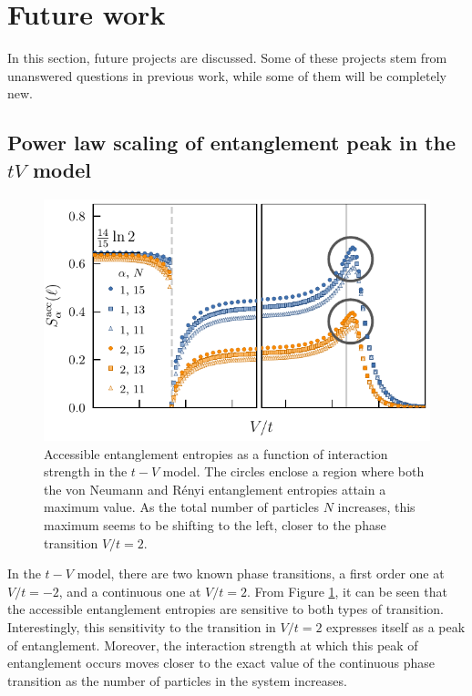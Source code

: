 \section{Future work}

	In this section, future projects are discussed. Some of these projects stem from unanswered questions in previous work, while some of them will be completely new.
	
	\subsection{Power law scaling of entanglement peak in the $tV$ model}
	
	\begin{figure}[h]
	\begin{center}
	\includegraphics[scale=1.0]{Images/operationalEntanglementEntropies_SOP5_withPeakCircles.pdf}
	\end{center}
	\caption{Accessible entanglement entropies as a function of interaction strength in the $t-V$ model. The circles enclose a region where both the von Neumann and R\'enyi entanglement entropies attain a maximum value. As the total number of particles $N$ increases, this maximum seems to be shifting to the left, closer to the phase transition $V/t=2$.}
	\label{fig:OEE_circledPeaks}
	\end{figure}
	
	In the $t-V$ model, there are two known phase transitions, a first order one at $V/t=-2$, and a continuous one at $V/t=2$. From Figure \ref{fig:OEE_circledPeaks}, it can be seen that the accessible entanglement entropies are sensitive to both types of transition. Interestingly, this sensitivity to the transition in $V/t=2$ expresses itself as a peak of entanglement. Moreover, the interaction strength at which this peak of entanglement occurs moves closer to the exact value of the continuous phase transition as the number of particles in the system increases.  
	
